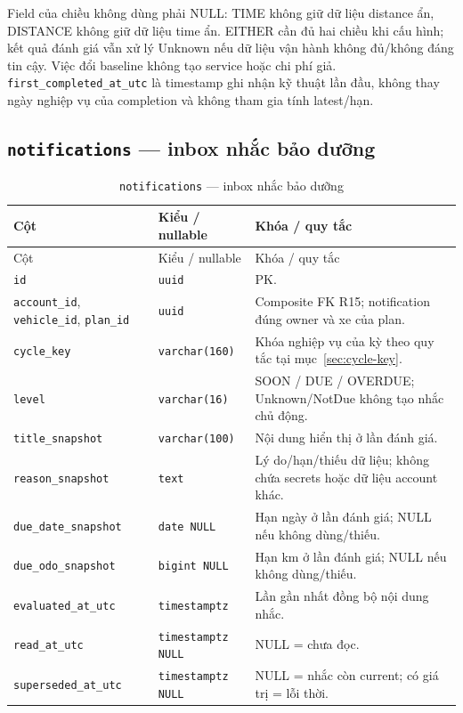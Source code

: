 Field của chiều không dùng phải NULL: TIME không giữ dữ liệu distance ẩn, DISTANCE không giữ dữ liệu time ẩn. EITHER cần đủ hai chiều khi cấu hình; kết quả đánh giá vẫn xử lý Unknown nếu dữ liệu vận hành không đủ/không đáng tin cậy. Việc đổi baseline không tạo service hoặc chi phí giả. \texttt{first\_\allowbreak{}completed\_\allowbreak{}at\_\allowbreak{}utc} là timestamp ghi nhận kỹ thuật lần đầu, không thay ngày nghiệp vụ của completion và không tham gia tính latest/hạn.\par
\subsection{\texttt{notifications} — inbox nhắc bảo dưỡng}
\begin{smalltable}\begin{longtable}{L{3.0cm}L{3.2cm}L{8.2cm}}
\caption{\texttt{notifications} — inbox nhắc bảo dưỡng}\label{tab:dictionary-12}\\\toprule
Cột & Kiểu / nullable & Khóa / quy tắc\\\midrule\endfirsthead
\toprule Cột & Kiểu / nullable & Khóa / quy tắc\\\midrule\endhead
\texttt{id} & \texttt{uuid} & PK.\\
\texttt{account\_\allowbreak{}id}, \texttt{vehicle\_\allowbreak{}id}, \texttt{plan\_\allowbreak{}id} & \texttt{uuid} & Composite FK R15; notification đúng owner và xe của plan.\\
\texttt{cycle\_\allowbreak{}key} & \texttt{varchar(160)} & Khóa nghiệp vụ của kỳ theo quy tắc tại mục~\ref{sec:cycle-key}.\\
\texttt{level} & \texttt{varchar(16)} & SOON / DUE / OVERDUE; Unknown/NotDue không tạo nhắc chủ động.\\
\texttt{title\_\allowbreak{}snapshot} & \texttt{varchar(100)} & Nội dung hiển thị ở lần đánh giá.\\
\texttt{reason\_\allowbreak{}snapshot} & \texttt{text} & Lý do/hạn/thiếu dữ liệu; không chứa secrets hoặc dữ liệu account khác.\\
\texttt{due\_\allowbreak{}date\_\allowbreak{}snapshot} & \texttt{date NULL} & Hạn ngày ở lần đánh giá; NULL nếu không dùng/thiếu.\\
\texttt{due\_\allowbreak{}odo\_\allowbreak{}snapshot} & \texttt{bigint NULL} & Hạn km ở lần đánh giá; NULL nếu không dùng/thiếu.\\
\texttt{evaluated\_\allowbreak{}at\_\allowbreak{}utc} & \texttt{timestamptz} & Lần gần nhất đồng bộ nội dung nhắc.\\
\texttt{read\_\allowbreak{}at\_\allowbreak{}utc} & \texttt{timestamptz NULL} & NULL = chưa đọc.\\
\texttt{superseded\_\allowbreak{}at\_\allowbreak{}utc} & \texttt{timestamptz NULL} & NULL = nhắc còn current; có giá trị = lỗi thời.\\
\bottomrule\end{longtable}\end{smalltable}
